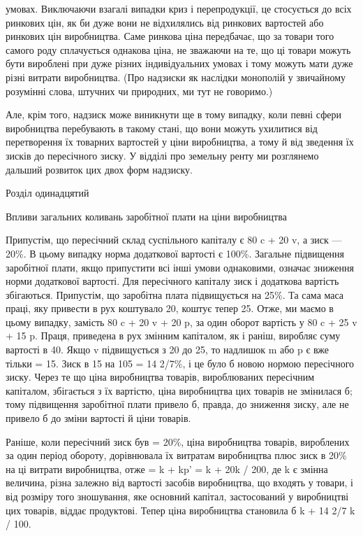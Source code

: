 умовах. Виключаючи взагалі випадки криз і перепродукції, це
стосується до всіх ринкових цін, як би дуже вони не відхилялись
від ринкових вартостей або ринкових цін виробництва.
Саме ринкова ціна передбачає, що за товари того самого роду
сплачується однакова ціна, не зважаючи на те, що ці товари
можуть бути вироблені при дуже різних індивідуальних умовах
і тому можуть мати дуже різні витрати виробництва. (Про надзиски
як наслідки монополій у звичайному розумінні слова, штучних
чи природних, ми тут не говоримо.)

Але, крім того, надзиск може виникнути ще в тому випадку,
коли певні сфери виробництва перебувають в такому стані, що
вони можуть ухилитися від перетворення їх товарних вартостей
у ціни виробництва, а тому й від зведення їх зисків до пересічного
зиску. У відділі про земельну ренту ми розглянемо
дальший розвиток цих двох форм надзиску.

Розділ одинадцятий

Впливи загальних коливань заробітної плати
на ціни виробництва

Припустім, що пересічний склад суспільного капіталу є
80 c + 20 v, а зиск — 20\%. В цьому випадку норма додаткової
вартості є 100\%. Загальне підвищення заробітної плати, якщо
припустити всі інші умови однаковими, означає зниження норми
додаткової вартості. Для пересічного капіталу зиск і додаткова
вартість збігаються. Припустім, що заробітна плата підвищується
на 25\%. Та сама маса праці, яку привести в рух коштувало 20,
коштує тепер 25. Отже, ми маємо в цьому випадку, замість
80 c + 20 v + 20 p, за один оборот вартість у 80 c + 25 v + 15 p.
Праця, приведена в рух змінним капіталом, як і раніш, виробляє
суму вартості в 40. Якщо v підвищується з 20 до 25, то надлишок
m або p є вже тільки = 15. Зиск в 15 на 105 = 14 2/7\%,
і це було б новою нормою пересічного зиску. Через те що
ціна виробництва товарів, вироблюваних пересічним капіталом,
збігається з їх вартістю, ціна виробництва цих товарів не змінилася
б; тому підвищення заробітної плати привело б, правда,
до зниження зиску, але не привело б до зміни вартості й ціни
товарів.

Раніше, коли пересічний зиск був = 20\%, ціна виробництва
товарів, вироблених за один період обороту, дорівнювала їх
витратам виробництва плюс зиск в 20\% на ці витрати виробництва,
отже = k + kp' = k + 20k / 200, де k є змінна величина, різна
залежно від вартості засобів виробництва, що входять у товари,
і від розміру того зношування, яке основний капітал, застосований
у виробництві цих товарів, віддає продуктові. Тепер
ціна виробництва становила б k + 14 2/7 k / 100.
